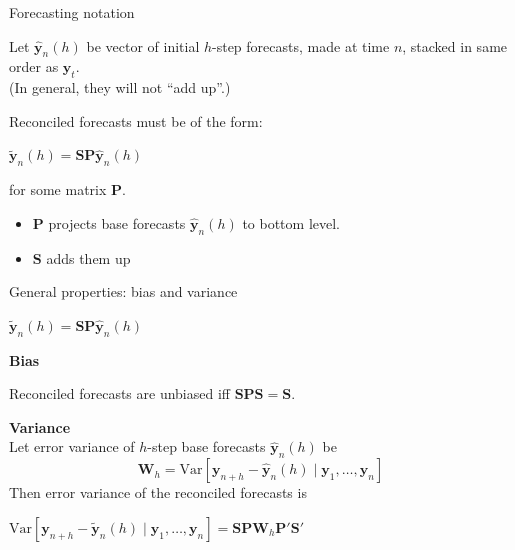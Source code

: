 \documentclass[14pt]{beamer}
\makeatletter
\def\biz{\begin{itemize}[<+-| alert@+>]}
\def\eiz{\end{itemize}}
\def\var{\text{Var}}
\def\by{\bm{y}}
\def\bS{\bm{S}}
\def\bSigma{\bm{W}}
\makeatother
\begin{document}
\begin{frame}{Forecasting notation}


Let $\hat{\by}_n(h)$ be vector of initial $h$-step forecasts, made at time $n$, stacked in same order as $\by_t$. \pause\\  (In general, they will not ``add up''.)\pause

\begin{block}{}
Reconciled forecasts must be of the form:

\centerline{$ \tilde{\by}_{n}(h)=\bS\bm{P}\hat{\by}_{n}(h)$}

for some matrix $\bm{P}$.
\end{block}\pause
\biz
\item
$\bm{P}$ projects base forecasts $\hat{\by}_{n}(h)$ to bottom level.
\item
$\bS$ adds them up
\eiz
\end{frame}

\begin{frame}{General properties: bias and variance}

\begin{block}{}
\centerline{$ \tilde{\by}_{n}(h)=\bS\bm{P}\hat{\by}_{n}(h)$}
\end{block}\pause%

\textbf{\alert{Bias}}
\begin{alertblock}{}\centering
Reconciled forecasts are unbiased iff $\bS\bm{P}\bS=\bS$.\rlap{\phantom{g}}
\end{alertblock}\pause

\textbf{\alert{Variance}}\\
Let error variance of $h$-step base forecasts $\hat{\by}_n(h)$ be
$$\bSigma_h = \var[\by_{n+h} - \hat{\by}_{n}(h) \mid \by_1,\dots,\by_n] $$
Then error variance of the reconciled forecasts is
\begin{alertblock}{}
\centerline{$\var[\by_{n+h} - \tilde{\by}_{n}(h)  \mid \by_1,\dots,\by_n]  = \bS\bm{P}\bSigma_{h}\bm{P}'\bS'$}
\end{alertblock}



\end{frame}
\end{document}
